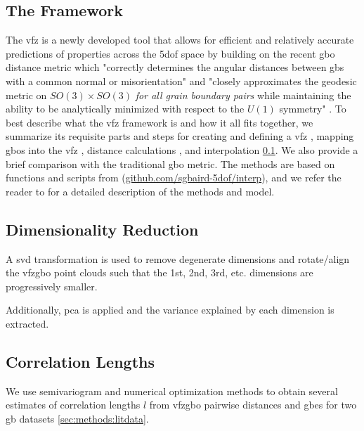 \documentclass[final,twocolumn,12pt]{elsarticle}
\begin{document}
	\subsection{The  Framework}
	\label{sec:methods:framework}

    The \gls{vfz} is a newly developed tool that allows for efficient and relatively accurate predictions of properties across the \gls{5dof} space \cite{bairdFiveDegreeofFreedomPropertyUnderReview} by building on the recent \gls{gbo} distance metric which "correctly determines the angular distances between \glspl{gb} with a common normal or misorientation" and "closely approximates the geodesic metric on $SO(3) \times SO(3)$ \textit{for all grain boundary pairs} while maintaining the ability to be analytically minimized with respect to the $U(1)$ symmetry" \cite{francisGeodesicOctonionMetric2019}. To best describe what the \gls{vfz} framework is and how it all fits together, we summarize its requisite parts and steps for creating and defining a \gls{vfz} %
    , mapping \glspl{gbo} into the \gls{vfz} %
    , distance calculations %
    , and interpolation %
    \cref{sec:methods:framework}. We also provide a brief comparison with the traditional \gls{gbo} metric. The methods are based on functions and scripts from (\url{github.com/sgbaird-5dof/interp}), and we refer the reader to \citet{bairdFiveDegreeofFreedomPropertyUnderReview} for a detailed description of the methods and model.

    \subsection{Dimensionality Reduction} \label{sec:methods:dim-reduce}
    A \gls{svd} transformation is used to remove degenerate dimensions and rotate/align the \gls{vfzgbo} point clouds such that the 1st, 2nd, 3rd, etc. dimensions are progressively smaller.
    
    Additionally, \gls{pca} is applied and the variance explained by each dimension is extracted.

    \subsection{Correlation Lengths} \label{sec:methods:correlation}
    We use semivariogram and numerical optimization methods to obtain several estimates of correlation lengths $l$ from \gls{vfzgbo} pairwise distances and \glspl{gbe} for two \gls{gb} datasets \cref{sec:methods:litdata}.
    
\end{document}
